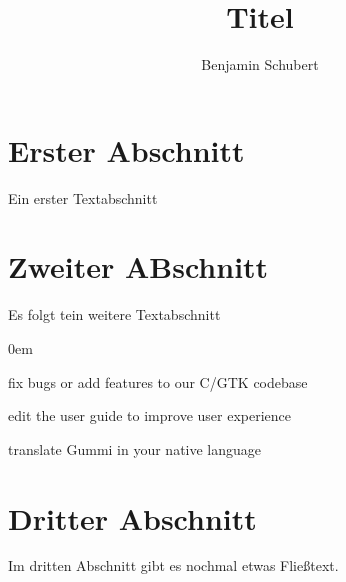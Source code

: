 \documentclass[11pt]{scrartcl}
\title{\textbf{Titel}}
\author{Benjamin Schubert}
\date{}
\begin{document}
\maketitle
\thispagestyle{empty}

\section{Erster Abschnitt}
Ein erster Textabschnitt

\section{Zweiter ABschnitt}
Es folgt tein weitere Textabschnitt
\begin{description}
\addtolength{\itemindent}{0.80cm}
\itemsep0em 
\item[Erstens] fix bugs or add features to our C/GTK codebase
\item[Zweitens] edit the user guide to improve user experience
\item[Drittens] translate Gummi in your native language
\end{description}

\section{Dritter Abschnitt}
Im dritten Abschnitt gibt es nochmal etwas Fließtext.
\end{document}
